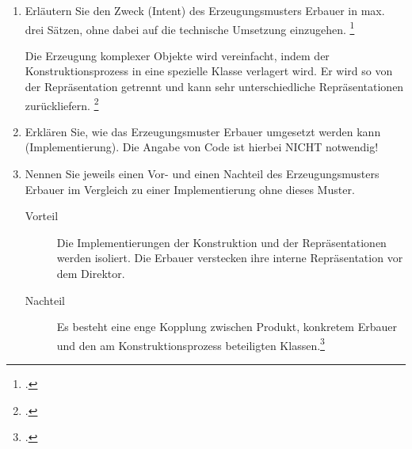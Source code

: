 \documentclass{bschlangaul-aufgabe}
\begin{document}

\begin{enumerate}


\item Erläutern Sie den Zweck (Intent) des Erzeugungsmusters Erbauer in
max. drei Sätzen, ohne dabei auf die technische Umsetzung einzugehen.
\footcite{examen:66116:2021:03}

\begin{liAntwort}
Die Erzeugung komplexer Objekte wird vereinfacht, indem der
Konstruktionsprozess in eine spezielle Klasse verlagert wird. Er wird so
von der Repräsentation getrennt und kann sehr unterschiedliche
Repräsentationen zurückliefern.
\footcite[Seite 29]{eilebrecht}
\end{liAntwort}


\item Erklären Sie, wie das Erzeugungsmuster Erbauer umgesetzt werden
kann (Implementierung). Die Angabe von Code ist hierbei NICHT notwendig!


\item Nennen Sie jeweils einen Vor- und einen Nachteil des
Erzeugungsmusters Erbauer im Vergleich zu einer Implementierung ohne
dieses Muster.

\begin{liAntwort}
\begin{description}
\item[Vorteil]

Die Implementierungen der Konstruktion und der Repräsentationen werden
isoliert. Die Erbauer verstecken ihre interne Repräsentation vor dem
Direktor.

\item[Nachteil]

Es besteht eine enge Kopplung zwischen Produkt, konkretem Erbauer und
den am Konstruktionsprozess beteiligten Klassen.\footcite{wiki:erbauer}
\end{description}
\end{liAntwort}

\end{enumerate}

\begin{liExkurs}
\bEntwurfsErbauerUml

\bEntwurfsErbauerAkteure
\end{liExkurs}
\end{document}

